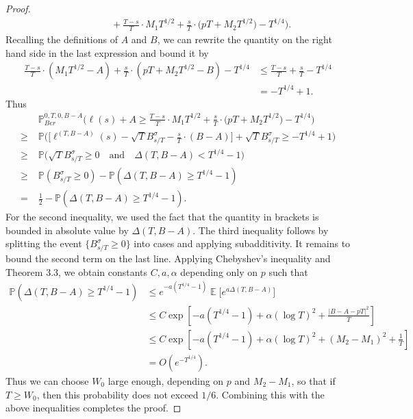 \documentclass[12pt]{article}
\DeclareMathOperator{\ex}{\mathbb{E}}
\begin{document}
\begin{proof}
\begin{align*}
		&\qquad\qquad + \frac{T-s}{T} \cdot M_1 T^{1/2} + \frac{s}{T} \cdot \big(p T + M_2 T^{1/2}\big) - T^{1/4} \Big).
		\end{align*}
		Recalling the definitions of $A$ and $B$, we can rewrite the quantity on the right hand side in the last expression and bound it by
		\begin{align*}
		\frac{T-s}{T}\cdot(M_1T^{1/2}-A) + \frac{s}{T}\cdot(pT + M_2T^{1/2} - B) - T^{1/4} &\leq  \frac{T-s}{T} + \frac{s}{T} - T^{1/4}\\
		& = -T^{1/4} + 1.
		\end{align*}
		Thus
		\begin{align*}
		&\mathbb{P}^{0,T,0,B-A}_{Ber}\Big( \ell(s) + A  \geq \frac{T-s}{T} \cdot M_1 T^{1/2} + \frac{s}{T} \cdot \big(p T + M_2 T^{1/2}\big) - T^{1/4} \Big)\\
		\geq \; & \mathbb{P}\Big( \Big[\ell^{(T,B-A)}(s) - \sqrt{T} B^\sigma_{s/T} - \frac{s}{T}\cdot(B-A)\Big] + \sqrt{T}B^\sigma_{s/T} \geq -T^{1/4} + 1 \Big)\\
		\geq \; & \mathbb{P}\Big( \sqrt{T}B^\sigma_{s/T} \geq 0 \quad \mathrm{and} \quad \Delta(T,B-A) < T^{1/4} - 1 \Big)\\
		\geq \; & \mathbb{P}\left( B^\sigma_{s/T} \geq 0 \right) - \mathbb{P}\left( \Delta(T,B-A) \geq T^{1/4} - 1 \right)\\
		= \; & \frac{1}{2} - \mathbb{P}\left( \Delta(T,B-A) \geq T^{1/4} - 1 \right).
		\end{align*}
		For the second inequality, we used the fact that the quantity in brackets is bounded in absolute value by $\Delta(T,B-A)$. The third inequality follows by splitting the event $\{B^\sigma_{s/T}\geq 0\}$ into cases and applying subadditivity. It remains to bound the second term on the last line. Applying Chebyshev's inequality and Theorem 3.3, we obtain constants $C,a,\alpha$ depending only on $p$ such that
		\begin{align*}
		\mathbb{P}\left( \Delta(T,B-A) \geq T^{1/4} - 1 \right) & \leq e^{-a(T^{1/4} - 1)} \ex\Big[ e^{a\Delta(T,B-A)} \Big]\\
		&\leq C \exp\left[ -a(T^{1/4}-1) + \alpha(\log T)^2 + \frac{|B-A-pT|^2}{T} \right]\\
		&\leq C \exp\left[ -a(T^{1/4}-1) + \alpha(\log T)^2 + (M_2-M_1)^2 + \frac{1}{T} \right]\\
		&= O(e^{-T^{1/4}}).
		\end{align*}
		Thus we can choose $W_0$ large enough, depending on $p$ and $M_2-M_1$, so that if $T \geq W_0$, then this probability does not exceed $1/6$. Combining this with the above inequalities completes the proof.
		
	\end{proof}
\end{document}
